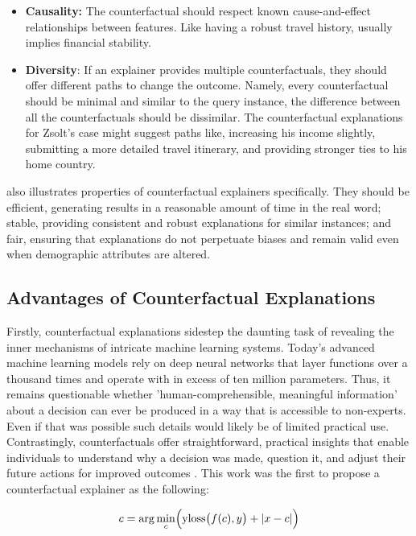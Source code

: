 \begin{itemize}
    \item \textbf{Causality:} The counterfactual should respect known cause-and-effect relationships between features. Like having a robust travel history, usually implies financial stability. 
    \item \textbf{Diversity}: If an explainer provides multiple counterfactuals, they should offer different paths to change the outcome. Namely, every counterfactual should be minimal and similar to the query instance, the difference between all the counterfactuals should be dissimilar. The counterfactual explanations for Zsolt's case might suggest paths like, increasing his income slightly, submitting a more detailed travel itinerary, and providing stronger ties to his home country.
\end{itemize}

\citet{guidotti2024counterfactual} also illustrates properties of counterfactual explainers specifically. They should be efficient, generating results in a reasonable amount of time in the real word; stable, providing consistent and robust explanations for similar instances; and fair, ensuring that explanations do not perpetuate biases and remain valid even when demographic attributes are altered.
\subsection{Advantages of Counterfactual Explanations}
Firstly, counterfactual explanations sidestep the daunting task of revealing the inner mechanisms of intricate machine learning systems. 
Today’s advanced machine learning models rely on deep neural networks that layer functions over a thousand times and operate with in excess of ten million parameters. Thus, it remains questionable whether 'human-comprehensible, meaningful information' about a decision can ever be produced in a way that is accessible to non-experts. Even if that was possible such details would likely be of limited practical use. Contrastingly, counterfactuals offer straightforward, practical insights that enable individuals to understand why a decision was made, question it, and adjust their future actions for improved outcomes \citep{wachter2017counterfactual}. This work was the first to propose a counterfactual explainer as the following:

\begin{equation}
c = \arg\min_{c} \Bigl(\mathrm{yloss}\bigl(f(c), y\bigr) + \lvert x - c \rvert\Bigr)
\end{equation}

